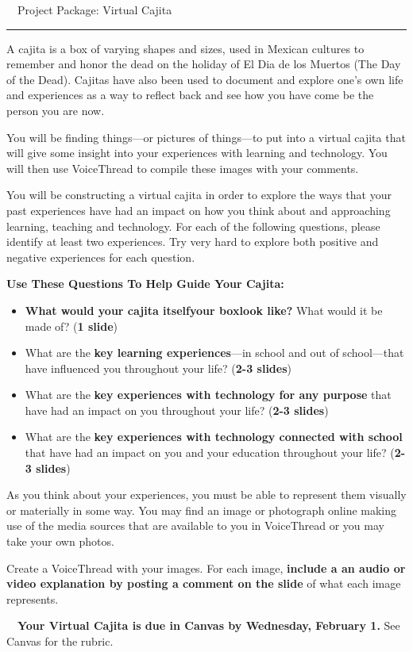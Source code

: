 \documentclass[10pt]{article}
\newcommand{\dueDate}[1]{\textbf{\textcolor{fsuMaroon}{#1}}}
\newcommand{\subHead}[1]{\noindent\textbf{\textsf{\textcolor{fsuMaroon}{#1}}}}
\newcommand{\dueCalendar}{\noindent\lettrine{\dueDate{\faCalendar}}{~~}}
\newcommand{\dueText}[1]{\normalsize\textsf{#1}}
\begin{document}
\begin{center}
\noindent\Large\dueDate{\faBriefcase}~~\textsf{Project Package: Virtual Cajita~~\dueDate{\faCube}}\normalsize\\
\rule{4in}{1pt}
\end{center}

A cajita is a box of varying shapes and sizes, used in Mexican cultures to remember and honor the dead on the holiday of El Dia de los Muertos (The Day of the Dead). Cajitas have also been used to document and explore one's own life and experiences as a way to reflect back and see how you have come be the person you are now.

You will be finding things---or pictures of things---to put into a virtual cajita that will give some insight into your experiences with learning and technology. You will then use VoiceThread to compile these images with your comments.

You will be constructing a virtual cajita in order to explore the ways that your past experiences have had an impact on how you think about and approaching learning, teaching and technology. For each of the following questions, please identify at least two experiences. Try very hard to explore both positive and negative experiences for each question.

\subHead{Use These Questions To Help Guide Your Cajita:}

\begin{itemize}
	\itemsep-0.5em
	\item \textbf{What would your cajita itself{\textemdash}your box{\textemdash}look like?} What would it be made of? (\textbf{1 slide})
	\item What are the \textbf{key learning experiences}---in school and out of school---that have influenced you throughout your life? (\textbf{2-3 slides})
	\item What are the \textbf{key experiences with technology for any purpose} that have had an impact on you throughout your life? (\textbf{2-3 slides})
	\item What are the \textbf{key experiences with technology connected with school} that have had an impact on you and your education throughout your life? (\textbf{2-3 slides})
\end{itemize}

As you think about your experiences, you must be able to represent them visually or materially in some way. You may find an image or photograph online making use of the media sources that are available to you in VoiceThread or you may take your own photos.

Create a VoiceThread with your images. For each image, \textbf{include a an audio or video explanation by posting a comment on the slide} of what each image represents.

\dueCalendar\dueText{\dueDate{Your Virtual Cajita is due in Canvas by Wednesday, February 1.} See Canvas for the rubric.}

%


%
\end{document}
